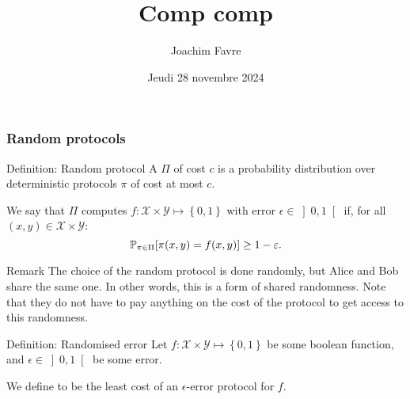 \documentclass[a4paper]{article}
\title{Comp comp}
\author{Joachim Favre}
\date{Jeudi 28 novembre 2024}
\begin{document}
\maketitle


\subsubsection{Random protocols}

\begin{parag}{Definition: Random protocol}
    A  $\Pi$ of cost $c$ is a probability distribution over deterministic protocols $\pi$ of cost at most $c$.

    We say that $\Pi$ computes $f: \mathcal{X} \times \mathcal{Y} \mapsto \left\{0, 1\right\}$ with error $\epsilon \in \left]0, 1\right[ $ if, for all $\left(x, y\right) \in \mathcal{X} \times \mathcal{Y}$: 
    \[\prob_{\pi \in \Pi}\left[\pi\left(x, y\right) = f\left(x, y\right)\right] \geq 1 - \epsilon.\]

    \begin{subparag}{Remark}
        The choice of the random protocol is done randomly, but Alice and Bob share the same one. In other words, this is a form of shared randomness. Note that they do not have to pay anything on the cost of the protocol to get access to this randomness.
    \end{subparag}
\end{parag}

\begin{parag}{Definition: Randomised error}
    Let $f: \mathcal{X} \times \mathcal{Y} \mapsto \left\{0 ,1\right\}$ be some boolean function, and $\epsilon \in \left]0, 1\right[ $ be some error.

    We define  to be the least cost of an $\epsilon$-error protocol for $f$.
\end{parag}
\end{document}
